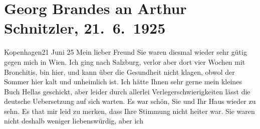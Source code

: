 

         
         \renewcommand{\erwaehntePersonen}{Personen:  ?? [Kusine von Gertrud Rung], Gertrud Rung, Otto Rung}
         \renewcommand{\erwaehnteInstitutionen}{Institutionen: Akademie der Wissenschaften}
         \renewcommand{\erwaehnteOrte}{Orte: Burgtheater, Italien, Kopenhagen, Moskau, Russland, Salzburg, Sankt Petersburg, Wien}
         \renewcommand{\erwaehnteWerke}{Werke: Der Schleier der Beatrice. Schauspiel in fünf Akten, Hellas}
               \section[Georg Brandes an Arthur Schnitzler, 21. 6. 1925]{ Georg Brandes an Arthur Schnitzler, 21. 6. 1925}\nopagebreak{}\rehead{ }\begin{ledgroupsized}[t]{13cm}\normalsize\beginnumbering \toendnotes[C]{\smallbreak\pagebreak[2]} 
\toendnotes[C]{\smallbreak}\pstart
           \raggedleft{}{\pb}Kopenhagen21 Juni 25\pend
           \pstart{}Mein lieber Freund\pend\pstart
           Sie waren diesmal wieder sehr gütig gegen mich in Wien. Ich ging nach Salzburg, verlor aber
               dort vier Wochen mit Bronchitis, bin hier, und kann über die Gesundheit nicht klagen,
               obwol der Sommer hier kalt und unheimlich ist.\pend
           \pstart
           Ich hätte Ihnen sehr gerne mein kleines Buch Hellas geschickt, aber leider durch allerlei Verlegerschwierigkeiten lässt
               die deutsche Uebersetzung auf sich warten.\pend
           \pstart
           Es war schön, Sie und Ihr Haus wieder zu sehn. Es that mir leid zu merken, dass Ihre
               Stimmung nicht heiter war. Sie waren nicht deshalb weniger liebenswürdig, aber ich

\end{ledgroupsized}
